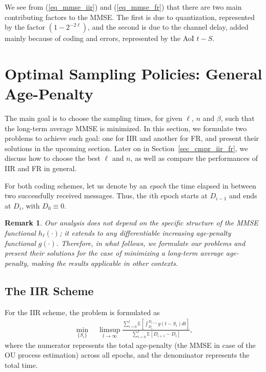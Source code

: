 \documentclass[12pt,journal,onecolumn]{IEEEtran}
\newtheorem{remark}{Remark}
\begin{document}
We see from (\ref{eq_mmse_iir}) and (\ref{eq_mmse_fr}) that there are two main contributing factors to the MMSE. The first is due to quantization, represented by the factor $\left(1-2^{-2\ell}\right)$, and the second is due to the channel delay, added mainly because of coding and errors, represented by the AoI $t-S$.



\section{Optimal Sampling Policies: General Age-Penalty}

The main goal is to choose the sampling times, for given $\ell$, $n$ and $\beta$, such that the long-term average MMSE is minimized. In this section, we formulate two problems to achieve such goal: one for IIR and another for FR, and present their solutions in the upcoming section. Later on in Section~\ref{sec_cmpr_iir_fr}, we discuss how to choose the best $\ell$ and $n$, as well as compare the performances of IIR and FR in general.

For both coding schemes, let us denote by an {\it epoch} the time elapsed in between two successfully received messages. Thus, the $i$th epoch starts at $D_{i-1}$ and ends at $D_i$, with $D_0\equiv0$.

\begin{remark}
Our analysis does not depend on the specific structure of the MMSE functional $h_\ell(\cdot)$; it extends to any differentiable increasing age-penalty functional $g(\cdot)$. Therefore, in what follows, we formulate our problems and present their solutions for the case of minimizing a long-term average age-penalty, making the results applicable in other contexts.
\end{remark}


\subsection{The IIR Scheme}

For the IIR scheme, the problem is formulated as
\begin{align} \label{opt_main_iir}
\min_{\{S_i\}}\quad\limsup_{l\rightarrow\infty}\frac{\sum_{i=0}^l\mathbb{E}\left[\int_{D_i}^{D_{i+1}}g\left(t-S_i\right)dt\right]}{\sum_{i=0}^l\mathbb{E}\left[D_{i+1}-D_i\right]},
\end{align}
where the numerator represents the total age-penalty (the MMSE in case of the OU process estimation) across all epochs, and the denominator represents the total time.
\end{document}
